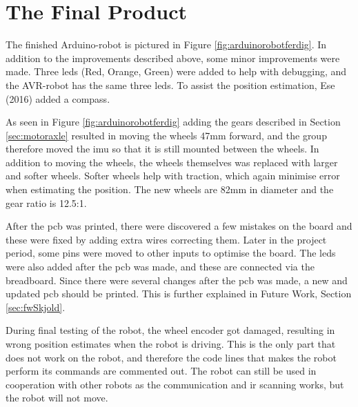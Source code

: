 \newpage
\section{The Final Product}
\label{sec:finardu}
The finished Arduino-robot is pictured in Figure \ref{fig:arduinorobotferdig}. In addition to the improvements described above, some minor improvements were made. Three \acrshort{led}s (Red, Orange, Green) were added to help with debugging, and the AVR-robot has the same three \acrshort{led}s. To assist the position estimation, Ese (2016) added a compass.

As seen in Figure \ref{fig:arduinorobotferdig} adding the gears described in Section \ref{sec:motoraxle} resulted in moving the wheels 47mm forward, and the group therefore moved the \acrshort{imu} so that it is still mounted between the wheels. In addition to moving the wheels, the wheels themselves was replaced with larger and softer wheels. Softer wheels help with traction, which again minimise error when estimating the position. The new wheels are 82mm in diameter and the gear ratio is 12.5:1.

After the \acrshort{pcb} was printed, there were discovered a few mistakes on the board and these were fixed by adding extra wires correcting them. Later in the project period, some pins were moved to other inputs to optimise the board. The \acrshort{led}s were also added after the \acrshort{pcb} was made, and these are connected via the breadboard. Since there were several changes after the \acrshort{pcb} was made, a new and updated \acrshort{pcb} should be printed. This is further explained in Future Work, Section \ref{sec:fwSkjold}.

During final testing of the robot, the wheel encoder got damaged, resulting in wrong position estimates when the robot is driving. This is the only part that does not work on the robot, and therefore the code lines that makes the robot perform its commands are commented out. The robot can still be used in cooperation with other robots as the communication and \acrshort{ir} scanning works, but the robot will not move.
\vspace*{20pt}
